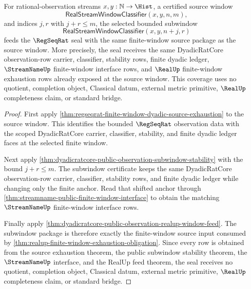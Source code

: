 \begin{theorem}
\label{thm:regseqrat-seal-finite-window-source-coverage}
For rational-observation streams $x,y:\mathbb{N}\to\Hist$, a certified source
window
$$
\mathsf{RealStreamWindowClassifier}(x,y,n,m),
$$
and indices $j,r$ with $j+r\le m$, the selected bounded subwindow
$$
\mathsf{RealStreamWindowClassifier}(x,y,n+j,r)
$$
feeds the $\RegSeqRat$ seal with the same finite-window source package as the
source window. More precisely, the seal receives the same
DyadicRatCore observation-row carrier, classifier, stability rows, finite
dyadic ledger, $\StreamNameUp$ finite-window interface rows, and $\RealUp$
finite-window exhaustion rows already exposed at the source window. This
coverage uses no quotient, completion object, Classical datum, external metric
primitive, $\RealUp$ completeness claim, or standard bridge.
\end{theorem}
\begin{proof}
First apply
\autoref{thm:regseqrat-finite-window-dyadic-source-exhaustion} to the source
window. This identifies the bounded $\RegSeqRat$ observation data with the
scoped DyadicRatCore carrier, classifier, stability, and finite dyadic ledger
faces at the selected finite window.

Next apply
\autoref{thm:dyadicratcore-public-observation-subwindow-stability} with the
bound $j+r\le m$. The subwindow certificate keeps the same DyadicRatCore
observation-row carrier, classifier, stability rows, and finite dyadic ledger
while changing only the finite anchor. Read that shifted anchor through
\autoref{thm:streamname-public-finite-window-interface} to obtain the matching
$\StreamNameUp$ finite-window interface rows.

Finally apply
\autoref{thm:dyadicratcore-public-observation-realup-window-feed}. The
subwindow package is therefore exactly the finite-window source input consumed
by \autoref{thm:realup-finite-window-exhaustion-obligation}. Since every row is
obtained from the source exhaustion theorem, the public subwindow stability
theorem, the $\StreamNameUp$ interface, and the RealUp feed theorem, the seal
receives no quotient, completion object, Classical datum, external metric
primitive, $\RealUp$ completeness claim, or standard bridge.
\end{proof}

